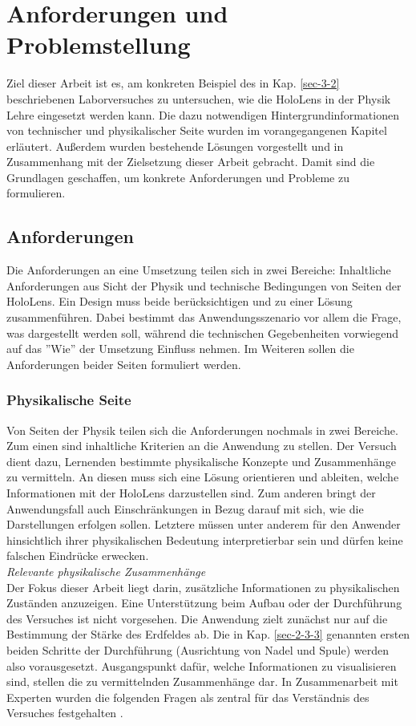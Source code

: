 \section{Anforderungen und Problemstellung}
\label{sec-3}
Ziel dieser Arbeit ist es, am konkreten Beispiel des in Kap. \ref{sec-3-2} beschriebenen Laborversuches zu untersuchen, wie die HoloLens in der Physik Lehre eingesetzt werden kann. Die dazu notwendigen Hintergrundinformationen von technischer und physikalischer Seite wurden im vorangegangenen Kapitel erläutert. Außerdem wurden bestehende Lösungen vorgestellt und in Zusammenhang mit der Zielsetzung dieser Arbeit gebracht. Damit sind die Grundlagen geschaffen, um konkrete Anforderungen und Probleme zu formulieren.

\subsection{Anforderungen}
\label{sec-3-1}
Die Anforderungen an eine Umsetzung teilen sich in zwei Bereiche: Inhaltliche Anforderungen aus Sicht der Physik und technische Bedingungen von Seiten der HoloLens. Ein Design muss beide berücksichtigen und zu einer Lösung zusammenführen. Dabei bestimmt das Anwendungsszenario vor allem die Frage, was dargestellt werden soll, während die technischen Gegebenheiten vorwiegend auf das ''Wie'' der Umsetzung Einfluss nehmen. Im Weiteren sollen die Anforderungen beider Seiten formuliert werden.

\subsubsection{Physikalische Seite}
\label{sec-3-1-1}
Von Seiten der Physik teilen sich die Anforderungen nochmals in zwei Bereiche. Zum einen sind inhaltliche Kriterien an die Anwendung zu stellen. Der Versuch dient dazu, Lernenden bestimmte physikalische Konzepte und Zusammenhänge zu vermitteln. An diesen muss sich eine Lösung orientieren und ableiten, welche Informationen mit der HoloLens darzustellen sind.
\noindent\hspace*{5mm}
Zum anderen bringt der Anwendungsfall auch Einschränkungen in Bezug darauf mit sich, wie die Darstellungen erfolgen sollen. Letztere müssen unter anderem für den Anwender hinsichtlich ihrer physikalischen Bedeutung interpretierbar sein und dürfen keine falschen Eindrücke erwecken.\\

\textit{Relevante physikalische Zusammenhänge}\\
Der Fokus dieser Arbeit liegt darin, zusätzliche Informationen zu physikalischen Zuständen anzuzeigen. Eine Unterstützung beim Aufbau oder der Durchführung des Versuches ist nicht vorgesehen. Die Anwendung zielt zunächst nur auf die Bestimmung der Stärke des Erdfeldes ab. Die in Kap. \ref{sec-2-3-3} genannten ersten beiden Schritte der Durchführung (Ausrichtung von Nadel und Spule) werden also vorausgesetzt. Ausgangspunkt dafür, welche Informationen zu visualisieren sind, stellen die zu vermittelnden Zusammenhänge dar. In Zusammenarbeit mit Experten wurden die folgenden Fragen als zentral für das Verständnis des Versuches festgehalten \cite{Reinholz18}.

